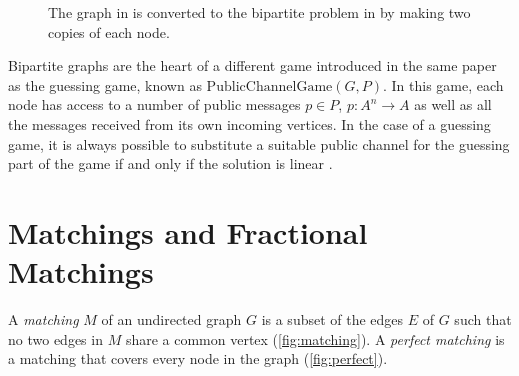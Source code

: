 \begin{figure}[ht]
     \centering
     \hspace{.3in}

		 \caption[Rearranging a graph into a bipartite flow problem]{The graph in  is converted to the bipartite problem in  by making two copies of each node.}
\end{figure}

Bipartite graphs are the heart of a different game introduced in the same paper as the guessing game, known as $\mathrm{PublicChannelGame}(G, P)$. In this game, each node has access to a number of public messages $p \in P$, $p : A^n \rightarrow A$ as well as all the messages received from its own incoming vertices. In the case of a guessing game, it is always possible to substitute a suitable public channel for the guessing part of the game if and only if the solution is linear \cite{riis2005util}.

\section{Matchings and Fractional Matchings}

A \emph{matching} $M$ of an undirected graph $G$ is a subset of the edges $E$ of $G$ such that no two edges in $M$ share a common vertex (\autoref{fig:matching}). A \emph{perfect matching} is a matching that covers every node in the graph (\autoref{fig:perfect}).

